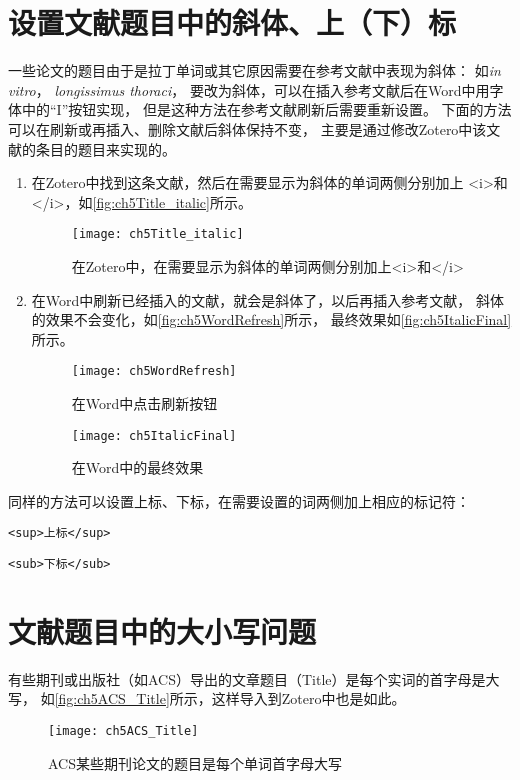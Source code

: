 \documentclass[cn,11pt,chinese]{elegantbook}
\begin{document}
		\section{设置文献题目中的斜体、上（下）标}\label{sec:italic}
			一些论文的题目由于是拉丁单词或其它原因需要在参考文献中表现为斜体：
			如\textit{in vitro}， \textit{longissimus thoraci}，
			要改为斜体，可以在插入参考文献后在Word中用字体中的“I”按钮实现，
			但是这种方法在参考文献刷新后需要重新设置。
			下面的方法可以在刷新或再插入、删除文献后斜体保持不变，
			主要是通过修改Zotero中该文献的条目的题目来实现的。
				\begin{enumerate}
					\item 在Zotero中找到这条文献，然后在需要显示为斜体的单词两侧分别加上
					<i>和</i>，如\autoref{fig:ch5Title_italic}所示。
						\begin{figure}[htbp]
							\centering
							\texttt{[image: ch5Title\_italic]}
							\caption{在Zotero中，在需要显示为斜体的单词两侧分别加上<i>和</i>}
							\label{fig:ch5Title_italic}
						\end{figure}
					\item 在Word中刷新已经插入的文献，就会是斜体了，以后再插入参考文献，
					斜体的效果不会变化，如\autoref{fig:ch5WordRefresh}所示，
					最终效果如\autoref{fig:ch5ItalicFinal}所示。
						\begin{figure}[htbp]
							\centering
							\texttt{[image: ch5WordRefresh]}
							\caption{在Word中点击刷新按钮}
							\label{fig:ch5WordRefresh}
						\end{figure}
						\begin{figure}[htbp]
							\centering
							\texttt{[image: ch5ItalicFinal]}
							\caption{在Word中的最终效果}
							\label{fig:ch5ItalicFinal}
						\end{figure}
				\end{enumerate}
			\vspace{1em}
			
			同样的方法可以设置上标、下标，在需要设置的词两侧加上相应的标记符：
					
			\verb|<sup>上标</sup> |	
			
			\verb|<sub>下标</sub> |


		\section{文献题目中的大小写问题}\label{sec:case}
			有些期刊或出版社（如ACS）导出的文章题目（Title）是每个实词的首字母是大写，
			如\autoref{fig:ch5ACS_Title}所示，这样导入到Zotero中也是如此。
				\begin{figure}[htbp]
					\centering
					\texttt{[image: ch5ACS\_Title]}
					\caption{ACS某些期刊论文的题目是每个单词首字母大写}
					\label{fig:ch5ACS_Title}
				\end{figure}	
			
\end{document}
